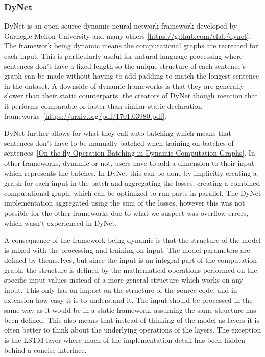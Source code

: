 \subsubsection*{DyNet}\label{sec:setup-implementations-dynet}

DyNet is an open source dynamic neural network framework developed by Garnegie
Mellon University and many others \ref{https://github.com/clab/dynet}. The
framework being dynamic means the computational graphs are recreated for each
input. This is particularly useful for natural language processing where
sentences don't have a fixed length so the unique structure of each sentence's
graph can be made without having to add padding to match the longest sentence in
the dataset. A downside of dynamic frameworks is that they are generally slower
than their static counterparts, the creators of DyNet though mention that it
performs comparable or faster than similar static declaration
frameworks~\ref{https://arxiv.org/pdf/1701.03980.pdf}.   

DyNet further allows for what they call auto-batching which means that sentences
don't have to be manually batched when training on batches of
sentences~\ref{On-the-fly Operation Batching in Dynamic Computation Graphs}. In
other frameworks, dynamic or not, users have to add a dimension to their input
which represents the batches. In DyNet this can be done by implicitly creating a
graph for each input in the batch and aggregating the losses, creating a
combined computational graph, which can be optimized to run parts in parallel.
The DyNet implementation aggregated using the sum of the losses, however this
was not possible for the other frameworks due to what we suspect was overflow
errors, which wasn't experienced in DyNet. 

A consequence of the framework being dynamic is that the structure of the model
is mixed with the processing and training on input. The model parameters are
defined by themselves, but since the input is an integral part of the
computation graph, the structure is defined by the mathematical operations
performed on the specific input values instead of a more general structure which
works on any input. This only has an impact on the structure of the source code,
and in extension how easy it is to understand it. The input should be processed
in the same way as it would be in a static framework, assuming the same
structure has been defined. This also means that instead of thinking of the
model as layers it is often better to think about the underlying operations of
the layers. The exception is the LSTM layer where much of the
implementation detail has been hidden behind a concise interface.

